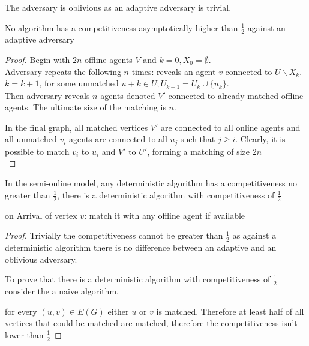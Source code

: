 The adversary is oblivious as an adaptive adversary is trivial.
\begin{remark}
	No algorithm has a competitiveness asymptotically higher than $\frac{1}{2}$ against an adaptive adversary
\end{remark}
\begin{figure}[H]
	\centering
	
\end{figure}
\begin{proof}
Begin with $2n$ offline agents $V$ and $k=0,X_0=\emptyset$.\\
Adversary repeats the following $n$ times: reveals an agent $v$ connected to $U\backslash X_k$. $k=k+1$, for some unmatched $u+k\in U; U_{k+1}=U_k\cup\{u_k\}$.\\
Then adversary reveals $n$ agents denoted $V'$ connected to already matched offline agents. The ultimate size of the matching is $n$.

In the final graph, all matched vertices $V'$ are connected to all online agents and all unmatched $v_i$ agents are connected to all $u_j$ such that $j\geq i$. Clearly, it is possible to match $v_i$ to $u_i$ and $V'$ to $U'$, forming a matching of size $2n$\\
\end{proof}
\begin{remark}
	In the semi-online model, any deterministic algorithm has a competitiveness no greater than $\frac{1}{2}$, there is a deterministic algorithm with competitiveness of $\frac{1}{2}$
\end{remark}
\begin{algorithm}
	\caption{Naive}
\begin{algorithmic}
	\item on Arrival of vertex $v$: match it with any offline agent if available
\end{algorithmic}
\end{algorithm}
\begin{proof}
	Trivially the competitiveness cannot be greater than $\frac{1}{2}$ as against a deterministic algorithm there is no difference between an adaptive and an oblivious adversary.

	To prove that there is a deterministic algorithm with competitiveness of $\frac{1}{2}$ consider the a naive algorithm.
	
	for every $(u,v)\in E(G)$ either $u$ or $v$ is matched. Therefore at least half of all vertices that could be matched are matched, therefore the competitiveness isn't lower than $\frac{1}{2}$
\end{proof}

